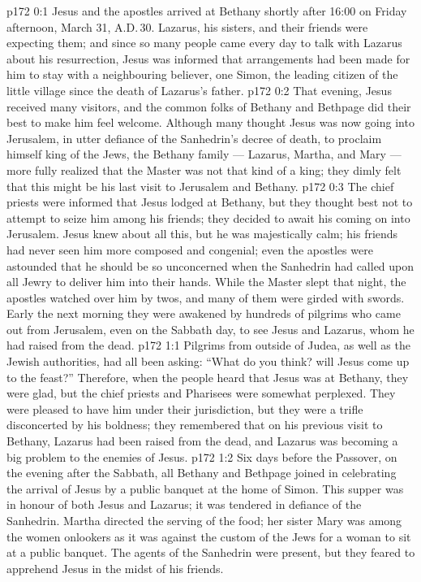 \author{Midwayer Commission}
\vs p172 0:1 Jesus and the apostles arrived at Bethany shortly after 16:00 on Friday afternoon, March 31, A.D.\,30. Lazarus, his sisters, and their friends were expecting them; and since so many people came every day to talk with Lazarus about his resurrection, Jesus was informed that arrangements had been made for him to stay with a neighbouring believer, one Simon, the leading citizen of the little village since the death of Lazarus’s father.
\vs p172 0:2 That evening, Jesus received many visitors, and the common folks of Bethany and Bethpage did their best to make him feel welcome. Although many thought Jesus was now going into Jerusalem, in utter defiance of the Sanhedrin’s decree of death, to proclaim himself king of the Jews, the Bethany family --- Lazarus, Martha, and Mary --- more fully realized that the Master was not that kind of a king; they dimly felt that this might be his last visit to Jerusalem and Bethany.
\vs p172 0:3 The chief priests were informed that Jesus lodged at Bethany, but they thought best not to attempt to seize him among his friends; they decided to await his coming on into Jerusalem. Jesus knew about all this, but he was majestically calm; his friends had never seen him more composed and congenial; even the apostles were astounded that he should be so unconcerned when the Sanhedrin had called upon all Jewry to deliver him into their hands. While the Master slept that night, the apostles watched over him by twos, and many of them were girded with swords. Early the next morning they were awakened by hundreds of pilgrims who came out from Jerusalem, even on the Sabbath day, to see Jesus and Lazarus, whom he had raised from the dead.
\vs p172 1:1 Pilgrims from outside of Judea, as well as the Jewish authorities, had all been asking: “What do you think? will Jesus come up to the feast?” Therefore, when the people heard that Jesus was at Bethany, they were glad, but the chief priests and Pharisees were somewhat perplexed. They were pleased to have him under their jurisdiction, but they were a trifle disconcerted by his boldness; they remembered that on his previous visit to Bethany, Lazarus had been raised from the dead, and Lazarus was becoming a big problem to the enemies of Jesus.
\vs p172 1:2 Six days before the Passover, on the evening after the Sabbath, all Bethany and Bethpage joined in celebrating the arrival of Jesus by a public banquet at the home of Simon. This supper was in honour of both Jesus and Lazarus; it was tendered in defiance of the Sanhedrin. Martha directed the serving of the food; her sister Mary was among the women onlookers as it was against the custom of the Jews for a woman to sit at a public banquet. The agents of the Sanhedrin were present, but they feared to apprehend Jesus in the midst of his friends.
